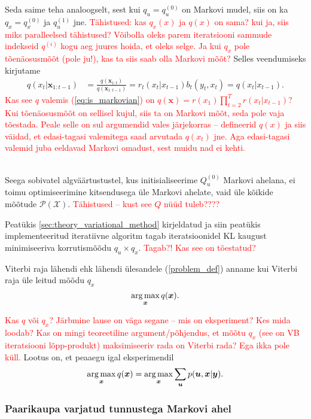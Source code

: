Seda saime teha analoogselt, sest kui $q_u = q_u^{(0)}$ on Markovi mudel, siis on ka $q_x = q_x^{(0)}$ ja $q_u^{(1)}$ jne. 
\textcolor{red}{Tähistused: kas $q_x(x)$ ja $q(x)$ on sama? kui ja, siis miks paralleelsed tähistused? Võibolla oleks parem iteratsiooni sammude indekseid $q^{(i)}$ kogu aeg juures hoida, et oleks selge. Ja kui $q_x$ pole tõenäosusmõõt (pole ju!), kas ta siis saab olla Markovi mõõt?}
Selles veendumiseks kirjutame
\begin{align}
    \label{eq:is_markovian}
    q(x_t | \bm{x}_{1:t-1}) &= \frac{q(\bm{x}_{1:t})}{q(\bm{x}_{1:t-1})} = r_t(x_t|x_{t-1}) b_t(y_t,x_t) = q(x_t | x_{t-1}).
\end{align}
\textcolor{red}{Kas see $q$ valemis (\ref{eq:is_markovian}) on $q(\bm{x}) = r(x_1)\prod_{t=2}^T r(x_t | x_{t-1})$? Kui tõenäosusmõõt on sellisel kujul, siis ta on Markovi mõõt, seda pole vaja tõestada. Peale selle on sul argumendid vales järjekorras -- defineerid $q(x)$ ja siis väidad, et edasi-tagasi valemitega saad arvutada $q(x_t)$ jne. Aga edasi-tagasi valemid juba eeldavad Markovi omadust, sest muidu nad ei kehti. 
\\\\
}


Seega sobivatel algväärtustustel, kus initisialiseerime $Q_u^{(0)}$ Markovi ahelana, ei toimu optimiseerimine kitsendusega üle Markovi ahelate, vaid üle kõikide mõõtude $\mathcal{P}(\mathcal{X})$.  \textcolor{red}{Tähistused -- kust see $Q$ nüüd tuleb????}

Peatükis \ref{sec:theory_variational_method} kirjeldatud ja siin peatükis implementeeritud iteratiivne algoritm tagab iteratsioonidel KL kaugust minimiseeriva korrutismõõdu $q_u \times q_x$.  \textcolor{red}{Tagab?! Kas see on tõestatud?}

Viterbi raja lähendi ehk lähendi ülesandele (\ref{problem_def}) anname kui Viterbi raja üle leitud mõõdu $q_x$
$$\operatorname*{arg\,max}_{\bm{x}} q(\bm{x}).$$

\textcolor{red}{Kas $q$ või $q_x$? Järbmine lause on väga segane -- mis on eksperiment? Kes mida loodab? Kas on mingi teoreetiline argument/põhjendus, et mõõtu $q_x$ (see on VB iteratsiooni lõpp-produkt) maksimiseeriv rada on Viterbi rada? Ega ikka pole küll. } Lootus on, et peaaegu igal eksperimendil
$$ \operatorname*{arg\,max}_{\bm{x}} q(\bm{x}) = \operatorname*{arg\,max}_{\bm{x}} \sum_{\bm{u}} p(\bm{u},\bm{x}|\bm{y}). $$

\subsubsection{Paarikaupa varjatud tunnustega Markovi ahel}\label{sec:BP_PMM}

